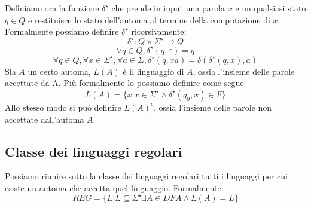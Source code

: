 Definiamo ora la funzione $\delta^{\star}$ che prende in input una parola $x$ e un qualsiasi stato $q \in Q$ e restituisce lo stato dell'automa al termine della computazione di $x$. Formalmente possiamo definire $\delta^{\star}$ ricorsivamente:
\[
     \delta^{\star} : Q \times \Sigma^{\star} \to Q
\]
\[
     \forall q \in Q, \delta^{\star}(q,\varepsilon) = q
\]
\[
     \forall q \in Q, \forall x \in \Sigma^{\star}, \forall a \in \Sigma, 
     \delta^{\star}(q,xa) = \delta (\delta^{\star}(q,x), a)
\]
Sia $A$ un certo automa, $L(A)$ \`e il linguaggio di $A$, ossia l'insieme delle parole accettate da A. Pi\`u formalmente lo possiamo definire come segue: 
\[
    L(A) = \{ x | x \in \Sigma^{\star} \land \delta^{\star}(q_0,x) \in F \}
\]
Allo stesso modo si pu\`o definire $L(A)^c$, ossia l'insieme delle parole non accettate dall'automa $A$.

\subsection{Classe dei linguaggi regolari}
Possiamo riunire sotto la classe dei linguaggi regolari tutti i linguaggi per cui esiste un automa che accetta quel linguaggio. Formalmente:
\[
     REG = \{ L | L \subseteq \Sigma^{\star} \exists A \in DFA \land L(A) = L \}
\]

